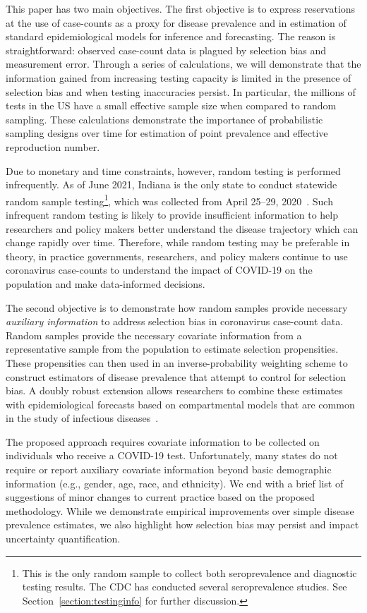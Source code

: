 \documentclass[11pt]{amsart}
\numberwithin{equation}{section}
\theoremstyle{plain}
\begin{document}
This paper has two main objectives.  The first objective is to express reservations at the use of case-counts as a proxy for disease prevalence and in estimation of standard epidemiological models for inference and forecasting.  The reason is straightforward: observed case-count data is plagued by selection bias and measurement error. Through a series of calculations, we will demonstrate that the information gained from increasing testing capacity is limited in the presence of selection bias and when testing inaccuracies persist.  In particular, the millions of tests in the US have a small effective sample size when compared to random sampling. These calculations demonstrate the importance of probabilistic sampling designs over time for estimation of point prevalence and effective reproduction number.

Due to monetary and time constraints, however, random testing is performed infrequently.  As of June 2021, Indiana is the only state to conduct statewide random sample testing\footnote{This is the only random sample to collect both seroprevalence and diagnostic testing results. The CDC has conducted several seroprevalence studies. See Section~\ref{section:testinginfo} for further discussion.}, which was collected from April 25--29, 2020~\citep{Yiannoutsos2021}.  Such infrequent random testing is likely to provide insufficient information to help researchers and policy makers better understand the disease trajectory which can change rapidly over time.  Therefore, while random testing may be preferable in theory, in practice governments, researchers, and policy makers continue to use coronavirus case-counts to understand the impact of COVID-19 on the population and make data-informed decisions.

The second objective is to demonstrate how random samples provide necessary \emph{auxiliary information} to address selection bias in coronavirus case-count data.  Random samples provide the necessary covariate information from a representative sample from the population to estimate selection propensities. These propensities can then used in an inverse-probability weighting scheme to construct estimators of disease prevalence that attempt to control for selection bias.  A doubly robust extension allows researchers to combine these estimates with epidemiological forecasts based on compartmental models that are common in the study of infectious diseases~\cite{Hao2020,Song2020,Ray2020,Johndrow2020}.

The proposed approach requires covariate information to be collected on individuals who receive a COVID-19 test.  Unfortunately, many states do not require or report auxiliary covariate information beyond basic demographic information (e.g., gender, age, race, and ethnicity).  We end with a brief list of suggestions of minor changes to current practice based on the proposed methodology. While we demonstrate empirical improvements over simple disease prevalence estimates, we also highlight how selection bias may persist and impact uncertainty quantification.
\end{document}
